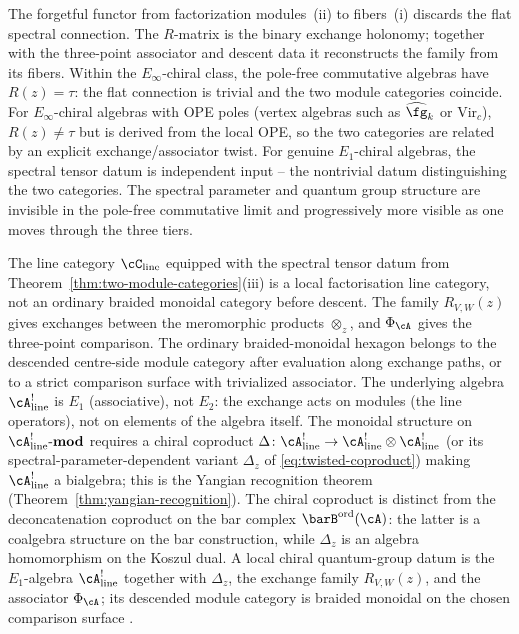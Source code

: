\begin{remark}
\label{rem:two-categories-vs-one}
The forgetful functor from factorization modules~(ii) to fibers~(i)
discards the flat spectral connection. The $R$-matrix is the binary
exchange holonomy; together with the three-point associator and descent
data it reconstructs the family from its fibers. Within the
$E_\infty$-chiral class, the pole-free commutative algebras have
$R(z) = \tau$: the flat connection is trivial and the two module
categories coincide. For $E_\infty$-chiral algebras with OPE poles
(vertex algebras such as $\widehat{\fg}_k$ or $\mathrm{Vir}_c$),
$R(z) \neq \tau$ but is derived from the local OPE, so the two
categories are related by an explicit exchange/associator twist. For
genuine $E_1$-chiral algebras, the spectral tensor datum is independent
input -- the nontrivial datum distinguishing the two categories. The
spectral parameter and quantum group structure are invisible in the pole-free
commutative limit and progressively more visible as one moves
through the three tiers.
\end{remark}

\begin{remark}
\label{rem:E2-category-E1-algebra}
The line category $\cC_{\mathrm{line}}$ equipped with the spectral
tensor datum from Theorem~\ref{thm:two-module-categories}(iii) is a
local factorisation line category, not an ordinary braided monoidal
category before descent. The family $R_{V,W}(z)$ gives exchanges
between the meromorphic products $\otimes_z$, and
$\Phi_\cA$ gives the three-point comparison. The ordinary
braided-monoidal hexagon belongs to the descended centre-side module
category after evaluation along exchange paths, or to a strict
comparison surface with trivialized associator. The underlying algebra
$\cA^!_{\mathrm{line}}$ is $E_1$ (associative), not $E_2$: the
exchange acts on modules (the line operators), not on elements of the
algebra itself. The monoidal structure on
$\cA^!_{\mathrm{line}}\text{-}\mathbf{mod}$ requires a chiral
coproduct
$\Delta \colon \cA^!_{\mathrm{line}} \to
\cA^!_{\mathrm{line}} \otimes \cA^!_{\mathrm{line}}$
(or its spectral-parameter-dependent variant $\Delta_z$ of
\eqref{eq:twisted-coproduct}) making $\cA^!_{\mathrm{line}}$ a
bialgebra; this is the Yangian recognition theorem
(Theorem~\ref{thm:yangian-recognition}). The chiral coproduct is
distinct from the deconcatenation coproduct on the bar complex
$\barB^{\mathrm{ord}}(\cA)$: the latter is a coalgebra structure on
the bar construction, while $\Delta_z$ is an algebra homomorphism on
the Koszul dual. A local chiral quantum-group datum is the
$E_1$-algebra $\cA^!_{\mathrm{line}}$ together with
$\Delta_z$, the exchange family $R_{V,W}(z)$, and the associator
$\Phi_\cA$; its descended module category is braided monoidal on the
chosen comparison surface \cite{GRZ23,JKL26}.
\end{remark}

